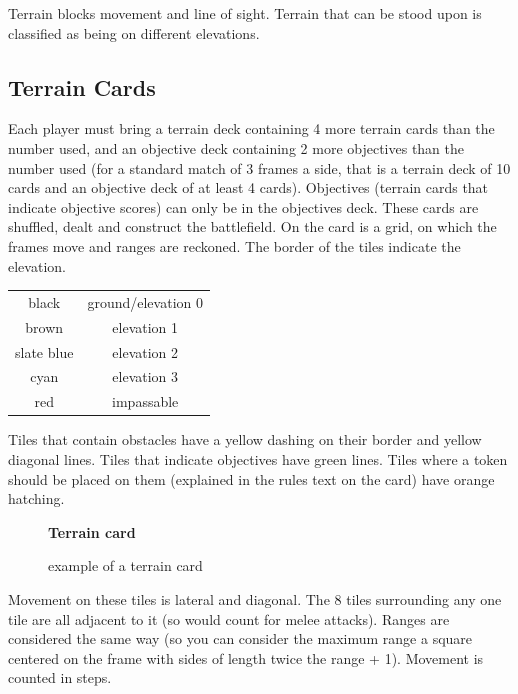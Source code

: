\documentclass[a4paper, twocolumn]{article}
\begin{document}
Terrain blocks movement and line of sight. Terrain that can be stood upon is classified as being on different elevations. 

\subsection{Terrain Cards}
Each player must bring a terrain deck containing 4 more terrain cards than the number used, and an objective deck containing 2 more objectives than the number used (for a standard match of 3 frames a side, that is a terrain deck of 10 cards and an objective deck of at least 4 cards).
Objectives (terrain cards that indicate objective scores) can only be in the objectives deck.
These cards are shuffled, dealt and construct the battlefield. On the card is a grid, on which the frames move and ranges are reckoned. 
The border of the tiles indicate the elevation.

\begin{tabular}{c c}
black & ground/elevation 0 \\
brown & elevation 1 \\
slate blue & elevation 2 \\ 
cyan & elevation 3\\
red & impassable \\
\end{tabular}

Tiles that contain obstacles have a yellow dashing on their border and yellow diagonal lines.
Tiles that indicate objectives have green lines.
Tiles where a token should be placed on them (explained in the rules text on the card) have orange hatching.

\begin{figure}[!hb]
  \centering
  \textbf{Terrain card}\par\medskip
  \resizebox{\textwidth/5}{!}{}
  \resizebox{\textwidth/5}{!}{}
  \par example of a terrain card\par\medskip
\end{figure}

Movement on these tiles is lateral and diagonal. The 8 tiles surrounding any one tile are all adjacent to it (so would count for melee attacks).
Ranges are considered the same way (so you can consider the maximum range a square centered on the frame with sides of length twice the range + 1).
Movement is counted in steps.
\end{document}
